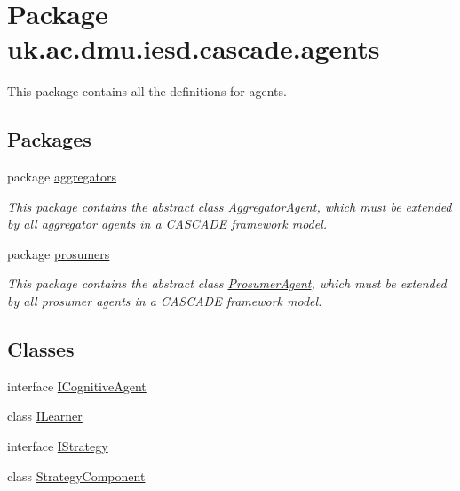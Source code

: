 \hypertarget{namespaceuk_1_1ac_1_1dmu_1_1iesd_1_1cascade_1_1agents}{\section{Package uk.\-ac.\-dmu.\-iesd.\-cascade.\-agents}
\label{namespaceuk_1_1ac_1_1dmu_1_1iesd_1_1cascade_1_1agents}
}


This package contains all the definitions for agents.  


\subsection*{Packages}
\begin{DoxyCompactItemize}
\item 
package \hyperlink{namespaceuk_1_1ac_1_1dmu_1_1iesd_1_1cascade_1_1agents_1_1aggregators}{aggregators}
\begin{DoxyCompactList}\small\item\em This package contains the abstract class \hyperlink{classuk_1_1ac_1_1dmu_1_1iesd_1_1cascade_1_1agents_1_1aggregators_1_1_aggregator_agent}{Aggregator\-Agent}, which must be extended by all aggregator agents in a C\-A\-S\-C\-A\-D\-E framework model. \end{DoxyCompactList}\item 
package \hyperlink{namespaceuk_1_1ac_1_1dmu_1_1iesd_1_1cascade_1_1agents_1_1prosumers}{prosumers}
\begin{DoxyCompactList}\small\item\em This package contains the abstract class \hyperlink{classuk_1_1ac_1_1dmu_1_1iesd_1_1cascade_1_1agents_1_1prosumers_1_1_prosumer_agent}{Prosumer\-Agent}, which must be extended by all prosumer agents in a C\-A\-S\-C\-A\-D\-E framework model. \end{DoxyCompactList}\end{DoxyCompactItemize}
\subsection*{Classes}
\begin{DoxyCompactItemize}
\item 
interface \hyperlink{interfaceuk_1_1ac_1_1dmu_1_1iesd_1_1cascade_1_1agents_1_1_i_cognitive_agent}{I\-Cognitive\-Agent}
\item 
class \hyperlink{classuk_1_1ac_1_1dmu_1_1iesd_1_1cascade_1_1agents_1_1_i_learner}{I\-Learner}
\item 
interface \hyperlink{interfaceuk_1_1ac_1_1dmu_1_1iesd_1_1cascade_1_1agents_1_1_i_strategy}{I\-Strategy}
\item 
class \hyperlink{classuk_1_1ac_1_1dmu_1_1iesd_1_1cascade_1_1agents_1_1_strategy_component}{Strategy\-Component}
\end{DoxyCompactItemize}


